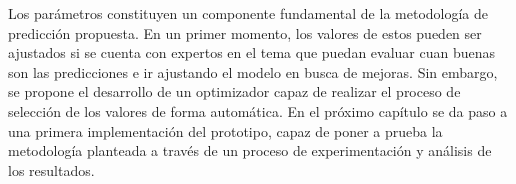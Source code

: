 Los parámetros constituyen un componente fundamental de la metodología de predicción propuesta. En un primer momento, los valores de estos pueden ser ajustados si se cuenta con expertos en el tema que puedan evaluar cuan buenas son las predicciones e ir ajustando el modelo en busca de mejoras. Sin embargo, se propone el desarrollo de un optimizador capaz de realizar el proceso de selección de los valores de forma automática. En el próximo capítulo se da paso a una primera implementación del prototipo, capaz de poner a prueba la metodología planteada a través de un proceso de experimentación y análisis de los resultados. 